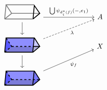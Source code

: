 \[\begin{tikzcd}[column sep=large]
	\begin{tikzpicture}[x=2em, y=2em]
    \draw[very thick, black!50]
        (0,0)--(2,0)
        (2.075,1)--(0.1,1)--(0,0)
        (0,0)--(0.5,0.4)--(0.1,1)
        (0.5,0.4)--(2.5,0.4);
	\draw[very thick] (2.02,0)--(2.5,0.4)--(2.11,0.95)--(2.02,0);
    \end{tikzpicture}
	 && A \\
	\begin{tikzpicture}[x=2em, y=2em,baseline=0.5em]
    \begin{scope}[very thick]
    \fill[fill=blue, opacity=0.3]
        (0,0)--(2,0)--(2.1,1)--(0.1,1)--(0,0);
    \fill[fill=blue!50!black, opacity=0.3]
        (0,0)--(0.5,0.4)--(2.5,0.4)--(2,0)--(0,0);
    \fill[fill=blue, opacity=0.2]
        (0.1,1)--(0.5,0.4)--(2.5,0.4)--(2.1,1)--(0.1,1);
    \fill[fill=blue, opacity=0.5]
        (0.1,1)--(0.5,0.4)--(0,0)--(0.1,1);
    \draw
        (0,0)--(2,0)--(2.1,1)--(0.1,1)--(0,0)
        (2.02,0)--(2.5,0.4)--(2.117,1.001)
        (2.05,0.4)--(2.5,0.4);
    \draw[dashed]
        (0,0)--(0.5,0.4)--(0.1,1)
        (0.5,0.4)--(2.05,0.4);
    \end{scope}
    \end{tikzpicture}
    && X \\
	\begin{tikzpicture}[x=2em, y=2em,baseline=0.5em]
    \begin{scope}[very thick]
    \fill[fill=blue, opacity=0.3]
        (0,0)--(2,0)--(2.1,1)--(0.1,1)--(0,0);
    \fill[fill=blue!50!black, opacity=0.3]
        (0,0)--(0.5,0.4)--(2.5,0.4)--(2,0)--(0,0);
    \fill[fill=blue, opacity=0.2]
        (0.1,1)--(0.5,0.4)--(2.5,0.4)--(2.1,1)--(0.1,1);
    \fill[fill=blue, opacity=0.5]
        (0.1,1)--(0.5,0.4)--(0,0)--(0.1,1);
    \fill[fill=blue, opacity=0.4]
        (2,0)--(2.5,0.4)--(2.1,1);
    \draw
        (0,0)--(2,0)--(2.1,1)--(0.1,1)--(0,0)
        (2.02,0)--(2.5,0.4)--(2.117,1.001);
    \draw[dashed]
        (0,0)--(0.5,0.4)--(0.1,1)
        (0.5,0.4)--(2.5,0.4);
    \end{scope}
    \end{tikzpicture}
	\arrow["\bigcup\psi_{d_i^*(f)}{(-,e_1)}", from=1-1, to=1-3]
	\arrow[from=1-1, to=2-1]
	\arrow[from=2-1, to=3-1]
	\arrow["{\psi_f}"', from=3-1, to=2-3]
	\arrow["\lambda"', dashed, from=2-1, to=1-3]
\end{tikzcd}\]